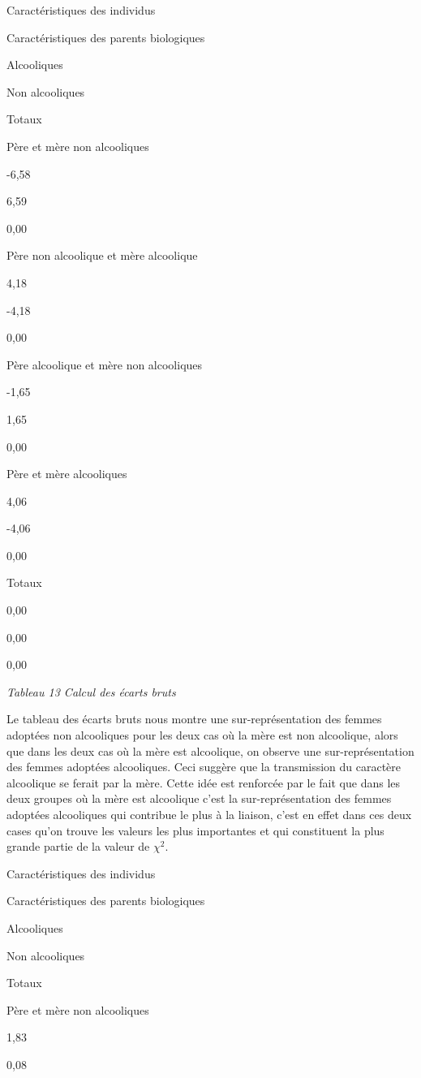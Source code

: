 \documentclass[]{book}
\theoremstyle{definition}
\theoremstyle{definition}
\theoremstyle{definition}
\theoremstyle{remark}
\begin{document}
Caractéristiques des individus

Caractéristiques des parents biologiques

Alcooliques

Non alcooliques

Totaux

Père et mère non alcooliques

-6,58

6,59

0,00

Père non alcoolique et mère alcoolique

4,18

-4,18

0,00

Père alcoolique et mère non alcooliques

-1,65

1,65

0,00

Père et mère alcooliques

4,06

-4,06

0,00

Totaux

0,00

0,00

0,00

\emph{Tableau 13 Calcul des écarts bruts}

Le tableau des écarts bruts nous montre une sur-représentation des
femmes adoptées non alcooliques pour les deux cas où la mère est non
alcoolique, alors que dans les deux cas où la mère est alcoolique, on
observe une sur-représentation des femmes adoptées alcooliques. Ceci
suggère que la transmission du caractère alcoolique se ferait par la
mère. Cette idée est renforcée par le fait que dans les deux groupes où
la mère est alcoolique c'est la sur-représentation des femmes adoptées
alcooliques qui contribue le plus à la liaison, c'est en effet dans ces
deux cases qu'on trouve les valeurs les plus importantes et qui
constituent la plus grande partie de la valeur de \(\chi^{2}\).

Caractéristiques des individus

Caractéristiques des parents biologiques

Alcooliques

Non alcooliques

Totaux

Père et mère non alcooliques

1,83

0,08
\end{document}
